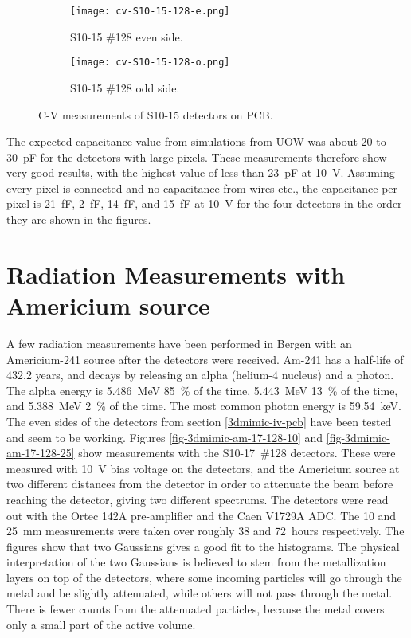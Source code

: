 \documentclass[../main/thesis.tex]{subfiles}
\begin{document}
\begin{figure}[h!]
	\centering
	\begin{subfigure}{.5\textwidth}
		\centering
		\texttt{[image: cv-S10-15-128-e.png]}
		\caption{S10-15 \#128 even side.}
		\label{fig-cv-S10-15-128-e}
	\end{subfigure}%
	\begin{subfigure}{.5\textwidth}
		\centering
		\texttt{[image: cv-S10-15-128-o.png]}
		\caption{S10-15 \#128 odd side.}
		\label{fig-cv-S10-15-128-o}
	\end{subfigure}
	\caption{C-V measurements of S10-15 detectors on PCB.}
	\label{fig-3d-cv-S10-15}
\end{figure}

The expected capacitance value from simulations from \gls{UOW} was about 20 to 30~pF for the detectors with large pixels. These measurements therefore show very good results, with the highest value of less than 23~pF at 10~V. Assuming every pixel is connected and no capacitance from wires etc., the capacitance per pixel is 21~fF, 2~fF, 14~fF, and 15~fF at 10~V for the four detectors in the order they are shown in the figures. 

\newpage
\section{Radiation Measurements with Americium source}

A few radiation measurements have been performed in Bergen with an Americium-241 source after the detectors were received. Am-241 has a half-life of 432.2 years, and decays by releasing an alpha (helium-4 nucleus) and a photon. The alpha energy is 5.486~MeV 85~\% of the time, 5.443~MeV 13~\% of the time, and 5.388~MeV 2~\% of the time. The most common photon  energy is 59.54~keV. \citep{Lund} The even sides of the detectors from section \ref{3dmimic-iv-pcb} have been tested and seem to be working. Figures \ref{fig-3dmimic-am-17-128-10} and \ref{fig-3dmimic-am-17-128-25} show measurements with the S10-17~\#128 detectors. These were measured with 10~V bias voltage on the detectors, and the Americium source at two different distances from the detector in order to attenuate the beam before reaching the detector, giving two different spectrums. The detectors were read out with the Ortec 142A pre-amplifier and the Caen V1729A ADC. The 10 and 25~mm measurements were taken over roughly 38 and 72~hours respectively. The figures show that two Gaussians gives a good fit to the histograms. The physical interpretation of the two Gaussians is believed to stem from the metallization layers on top of the detectors, where some incoming particles will go through the metal and be slightly attenuated, while others will not pass through the metal. There is fewer counts from the attenuated particles, because the metal covers only a small part of the active volume. 
\end{document}
